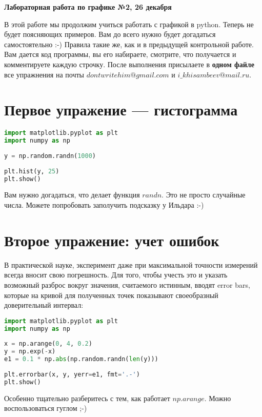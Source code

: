 \documentclass[a4paper,12pt]{article}
\begin{document}
\begin{center}
\Large{\textbf{Лабораторная работа по графике №2, 26 декабря}}
\end{center}
В этой работе мы продолжим учиться работать с графикой в python. Теперь не будет поясняющих примеров. Вам до всего нужно будет догадаться самостоятельно :-) Правила такие же, как и в предыдущей контрольной работе. Вам дается код программы, вы его набираете, смотрите, что получается и комментируете каждую строчку. После выполнения присылаете в { \bfseries одном файле } все упражнения на почты $dontwritehim@gmail.com$ и $i\_khisambeev@mail.ru$.

\section{Первое упражение --- гистограмма}
\begin{lstlisting}[language=python]
import matplotlib.pyplot as plt
import numpy as np
 
y = np.random.randn(1000)
 
plt.hist(y, 25)
plt.show()
\end{lstlisting}
Вам нужно догадаться, что делает функция $randn$. Это не просто случайные числа. Можете попробовать заполучить подсказку у Ильдара :-)



\section{Второе упражение: учет ошибок}
В практической науке, эксперимент даже при максимальной точности измерений всегда вносит свою погрешность. Для того, чтобы учесть это и указать возможный разброс вокруг значения, считаемого истинным, вводят error bars, которые на кривой для полученных точек показывают своеобразный доверительный интервал:
\begin{lstlisting}[language=python]
import matplotlib.pyplot as plt
import numpy as np
 
x = np.arange(0, 4, 0.2)
y = np.exp(-x)
e1 = 0.1 * np.abs(np.random.randn(len(y)))
 
plt.errorbar(x, y, yerr=e1, fmt='.-')
plt.show()
\end{lstlisting}
Особенно тщательно разберитесь с тем, как работает $np.arange$. Можно воспользоваться гуглом ;-)
\end{document}
